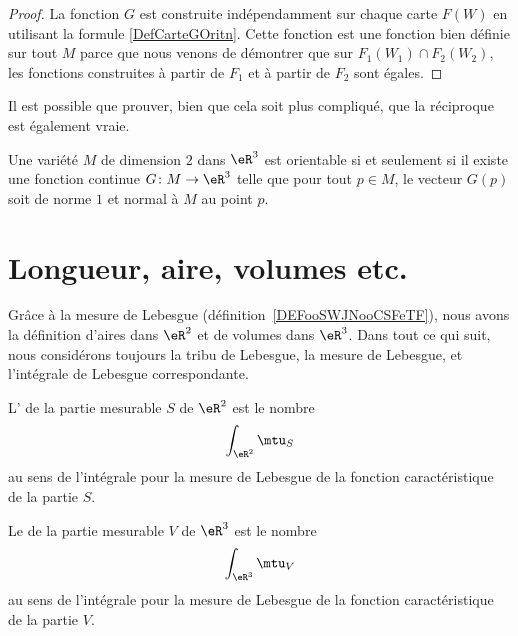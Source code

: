 \begin{proof}
	La fonction \( G\) est construite indépendamment sur chaque carte \( F(W)\) en utilisant la formule \eqref{DefCarteGOritn}. Cette fonction est une fonction bien définie sur tout \( M\) parce que nous venons de démontrer que sur \( F_1(W_1)\cap F_2(W_2)\), les fonctions construites à partir de \( F_1\) et à partir de \( F_2\) sont égales.
\end{proof}

Il est possible que prouver, bien que cela soit plus compliqué, que la réciproque est également vraie.
\begin{proposition}		\label{PROPooGHXTooPrAESF}
	Une variété \( M\) de dimension \( 2\) dans \( \eR^3\) est orientable si et seulement si il existe une fonction continue \( G\colon M\to \eR^3\) telle que pour tout \( p\in M\), le vecteur \( G(p)\) soit de norme \( 1\) et normal à \( M\) au point \( p\).
\end{proposition}

\section{Longueur, aire, volumes etc.}

Grâce à la mesure de Lebesgue (définition~\ref{DEFooSWJNooCSFeTF}), nous avons la définition d'aires dans \( \eR^2\) et de volumes dans \( \eR^3\). Dans tout ce qui suit, nous considérons toujours la tribu de Lebesgue, la mesure de Lebesgue, et l'intégrale de Lebesgue correspondante.

\begin{definition}      \label{DEFooPZRDooWbbBXy}
	L' de la partie mesurable \( S\) de \( \eR^2\) est le nombre
	\begin{equation}
		\int_{\eR^2}\mtu_S
	\end{equation}
	au sens de l'intégrale pour la mesure de Lebesgue de la fonction caractéristique de la partie \( S\).
\end{definition}

\begin{definition}
	Le  de la partie mesurable \( V\) de \( \eR^3\) est le nombre
	\begin{equation}
		\int_{\eR^3}\mtu_V
	\end{equation}
	au sens de l'intégrale pour la mesure de Lebesgue de la fonction caractéristique de la partie \( V\).
\end{definition}

